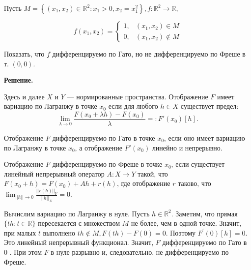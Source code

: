 \begin{task} 
    Пусть $M=\left\{\left(x_{1}, x_{2}\right) \in \mathbb{R}^{2}: x_{1}>0, x_{2}=x_{1}^{2}\right\}, f: \mathbb{R}^{2} \rightarrow \mathbb{R}$,

    $$
    f\left(x_{1}, x_{2}\right)= \begin{cases}1, & \left(x_{1}, x_{2}\right) \in M \\ 0, & \left(x_{1}, x_{2}\right) \notin M\end{cases}
    $$
    
    Показать, что $f$ дифференцируемо по Гато, но не дифференцируемо по Фреше в т. $(0,0)$.
    
    \textbf{Решение.} 

    \begin{definition}
        Здесь и далее $X$ и $Y$ --- нормированные пространства.
        Отображение $F$ имеет вариацию по Лагранжу в точке $x_0$ если для любого $h \in X$ существует предел:
        \begin{equation*}
            \lim _{\lambda \rightarrow 0} \frac{F(x_0 + \lambda h) - F(x_0)}{\lambda} =: F'(x_0)[h].
        \end{equation*}
    \end{definition}

    \begin{definition}
        Отображение $F$ дифференцируемо по Гато в точке $x_0$, если оно имеет вариацию по Лагранжу в точке $x_0$,
        а отображение $F'(x_0)$ линейно и непрерывно.
    \end{definition}

    \begin{definition}
        Отображение $F$ дифференцируемо по Фреше в точке $x_0$, если существует линейный непрерывный оператор 
        $A: X \rightarrow Y$ такой, что $F(x_0 + h) = F(x_0) + A h + r(h)$, где отображение $r$ таково, что
        $\lim _{||h|| \rightarrow 0} \frac{||r(h)||_Y}{||h||_X} = 0 $.
    \end{definition}

    Вычислим вариацию по Лагранжу в нуле. Пусть $h \in \mathbb{R}^{2}$. Заметим, что прямая $\{t h: t \in \mathbb{R}\}$ пересекается с множеством $M$ не более, чем в одной точке. Значит, при малых $t$ выполнено $t h \notin M, F(t h)-F(0)=0$. Поэтому $F^{\prime}(0)[h]=0$. Это линейный непрерывный функционал. Значит, $F$ дифференцируемо по Гато в 0 . При этом $F$ в нуле разрывно и, следовательно, не дифференцируемо по Фреше.
    \end{task}
    